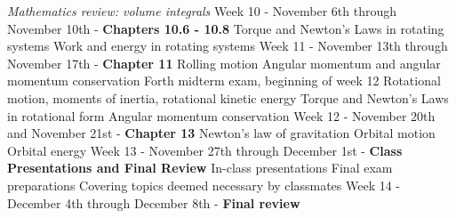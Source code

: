 \documentclass[10pt]{article}
\begin{document}
\begin{outline}[enumerate]
\3 \textit{Mathematics review: volume integrals}
\1 Week 10 - November 6th through November 10th - \textbf{Chapters 10.6 - 10.8}
\2 Torque and Newton's Laws in rotating systems
\2 Work and energy in rotating systems
\1 Week 11 - November 13th through November 17th - \textbf{Chapter 11}
\2 Rolling motion
\2 Angular momentum and angular momentum conservation
\1 Forth midterm exam, beginning of week 12
\2 Rotational motion, moments of inertia, rotational kinetic energy
\2 Torque and Newton's Laws in rotational form
\2 Angular momentum conservation
\1 Week 12 - November 20th and November 21st - \textbf{Chapter 13}
\2 Newton's law of gravitation
\2 Orbital motion
\2 Orbital energy
\1 Week 13 - November 27th through December 1st  - \textbf{Class Presentations and Final Review}
\2 In-class presentations
\2 Final exam preparations
\2 Covering topics deemed necessary by classmates
\1 Week 14 - December 4th through December 8th - \textbf{Final review}
\end{outline}
\end{document}

